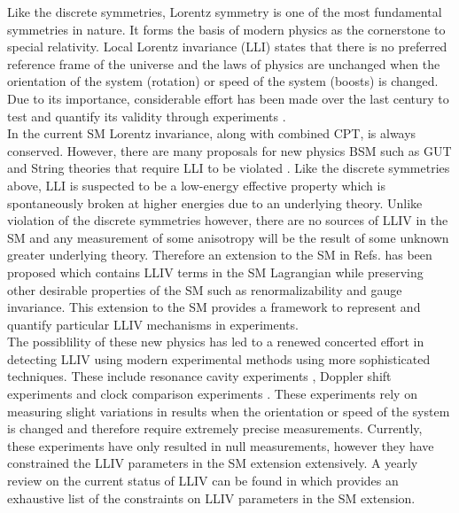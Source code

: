 \documentclass[10pt,a4paper, twoside]{report}
\begin{document}
Like the discrete symmetries, Lorentz symmetry is one of the most fundamental symmetries in nature. It forms the basis of modern physics as the cornerstone to special relativity. Local Lorentz invariance (LLI) states that there is no preferred reference frame of the universe and the laws of physics are unchanged when the orientation of the system (rotation) or speed of the system (boosts) is changed. Due to its importance, considerable effort has been made over the last century to test and quantify its validity through experiments \cite{Michelson1887, Kennedy1932, Ives1938, Robertson1949, LorentzTestSeries}.  \\
\linebreak
In the current SM Lorentz invariance, along with combined CPT, is always conserved. However, there are many proposals for new physics BSM such as GUT and String theories that require LLI to be violated \cite{Kostelecky1989,  Damour, Gambini1999, Pospelov2012, Kostelecky1995, Mavromatos2007, Liberati2013}.  Like the discrete symmetries above, LLI is suspected to be a low-energy effective property which is spontaneously broken at higher energies due to an underlying theory. Unlike violation of the discrete symmetries however,  there  are no sources of LLIV in the SM and any measurement of some anisotropy will be the result of some unknown greater underlying theory. Therefore an extension to the SM in Refs. \cite{Colladay1997, Colladay1998, Kostelecky1999, LorentzDataTables2017} has been proposed which contains LLIV terms in the SM Lagrangian while preserving other desirable properties of the SM such as renormalizability and gauge invariance. This extension to the SM provides a framework to represent and quantify particular LLIV mechanisms in experiments. \\
\linebreak
The possiblility of these new physics has led to a renewed concerted effort in detecting LLIV using modern experimental methods using more sophisticated techniques. These include  resonance cavity experiments \cite{Muller2005, Muller2003, Wolf2004}, Doppler shift experiments \cite{Lane2005, Saathoff2003} and clock comparison experiments \cite{Prestage1985, Chupp1989, Hohensee2013, Dzuba2016}. These experiments rely on measuring slight variations in results when the orientation or speed of the system is changed and therefore require extremely precise measurements. Currently, these experiments have only resulted in null measurements, however they have constrained the LLIV parameters in the SM extension extensively. A yearly review on the current status of LLIV can be found in \cite{LorentzDataTables2019} which provides an exhaustive list of the constraints on LLIV parameters in the SM extension.\\
\end{document}
